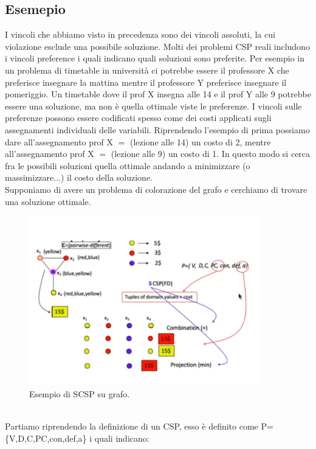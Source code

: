 \subsection{Esemepio}
I vincoli che abbiamo visto in precedenza sono dei vincoli assoluti, la cui violazione esclude una possibile soluzione. Molti dei problemi CSP reali includono i vincoli preference i quali indicano quali soluzioni sono preferite. Per esempio in un problema di timetable in università ci potrebbe essere il professore X che preferisce insegnare la mattina mentre il professore Y preferisce insegnare il pomeriggio. Un timetable dove il prof X insegna alle 14 e il prof Y alle 9 potrebbe essere una soluzione, ma non è quella ottimale viste le preferenze. I vincoli sulle preferenze possono essere codificati spesso come dei costi applicati sugli assegnamenti individuali delle variabili. Riprendendo l’esempio di prima possiamo dare all’assegnamento prof X $=$ (lezione alle 14) un costo di 2, mentre all’assegnamento prof X $=$ (lezione alle 9) un costo di 1. In questo modo si cerca fra le possibili soluzioni quella ottimale andando a minimizzare (o massimizzare...) il costo della soluzione.
\\Supponiamo di avere un problema di colorazione del grafo e cerchiamo di trovare una
soluzione ottimale.
\begin{figure}[htp]
	\centering
    \includegraphics[width=10cm, keepaspectratio]{img/Cap4/scsp.png}
    \caption{Esempio di SCSP su grafo.}
\end{figure}
\\Partiamo riprendendo la definizione di un CSP, esso è definito come P=\{V,D,C,PC,con,def,a\} i quali indicano:
